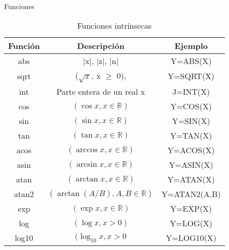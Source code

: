 \begin{frame}[fragile]{Funciones} 
    \begin{table}[]
    \centering
    \label{Tabla_funcionesintr1}
    \resizebox{9cm}{!} {
    \begin{tabular}{|c|c|c|}
    \hline
    Función              & Descripción                                  & Ejemplo         \\ \hline
    abs                  & |x|, |z|, |n|                                & Y=ABS(X)        \\ \hline
    sqrt                 & ($\sqrt{x}$, x $\geq$ 0),                    & Y=SQRT(X)       \\ \hline
    int                  & Parte entera de un real x                    & J=INT(X)        \\ \hline  
    cos                  & $(\cos x, x \in \mathbb{R})$                 & Y=COS(X)        \\ \hline 
    sin                  & $(\sin x, x \in \mathbb{R})$                 & Y=SIN(X)        \\ \hline 
    tan                  & $(\tan x, x \in \mathbb{R})$                 & Y=TAN(X)        \\ \hline 
    acos                 & $(\arccos x, x \in \mathbb{R})$              & Y=ACOS(X)       \\ \hline 
    asin                 & $(\arcsin x, x \in \mathbb{R})$              & Y=ASIN(X)       \\ \hline 
    atan                 & $(\arctan x, x \in \mathbb{R})$              & Y=ATAN(X)       \\ \hline
    atan2                & $(\arctan (A/B), A, B \in \mathbb{R})$       & Y=ATAN2(A,B)    \\ \hline 
    exp                  & $(\exp x, x \in \mathbb{R})$                 & Y=EXP(X)        \\ \hline 
    log                  & $(\log x, x > 0)$                            & Y=LOG(X)        \\ \hline 
    log10                & $(\log_{10} x, x > 0$                        & Y=LOG10(X)      \\ \hline 
    \end{tabular}}
    \caption*{Funciones intrínsecas}
    \end{table}
\end{frame}

